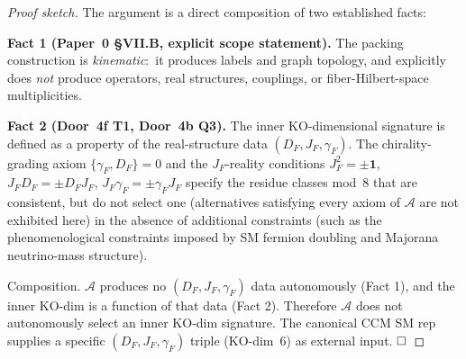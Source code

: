 \documentclass[11pt]{article}
\begin{document}
\begin{proof}[Proof sketch]
The argument is a direct composition of two established facts:

\textbf{Fact 1 (Paper~0 \S VII.B, explicit scope statement).} The
packing construction is \emph{kinematic}:\ it produces labels and
graph topology, and explicitly does \emph{not} produce operators,
real structures, couplings, or fiber-Hilbert-space multiplicities.

\textbf{Fact 2 (Door~4f T1, Door~4b Q3).} The inner KO-dimensional
signature is defined as a property of the real-structure data
$(D_F, J_F, \gamma_F)$. The chirality-grading axiom
$\{\gamma_F, D_F\} = 0$ and the $J_F$-reality conditions
$J_F^2 = \pm \mathbf{1}$, $J_F D_F = \pm D_F J_F$, $J_F \gamma_F =
\pm \gamma_F J_F$ specify the residue classes mod~$8$ that are
consistent, but do not select one (alternatives satisfying every
axiom of $\mathcal{A}$ are not exhibited here) in the absence of
additional constraints (such as the phenomenological constraints
imposed by SM fermion doubling and Majorana neutrino-mass
structure).

Composition.  $\mathcal{A}$ produces no $(D_F, J_F, \gamma_F)$ data
autonomously (Fact 1), and the inner KO-dim is a function of that
data (Fact 2).  Therefore $\mathcal{A}$ does not autonomously select
an inner KO-dim signature.  The canonical CCM SM rep supplies a
specific $(D_F, J_F, \gamma_F)$ triple (KO-dim~$6$) as external input.
$\hfill\square$
\end{proof}
\end{document}
